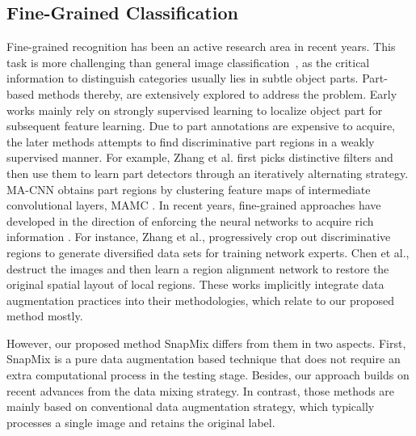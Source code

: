 \documentclass[letterpaper]{article} \usepackage{aaai21}  \usepackage{times}  \usepackage{helvet} \usepackage{courier}  \usepackage[hyphens]{url}  \usepackage{graphicx} \urlstyle{rm} \def\UrlFont{\rm}  \usepackage{natbib}  \usepackage{caption} \frenchspacing  \setlength{\pdfpagewidth}{8.5in}  \setlength{\pdfpageheight}{11in}
\begin{document}
\subsection{Fine-Grained Classification} 
Fine-grained recognition has been an active research area in recent years. This task is more challenging than general 
image classification~\cite{LiuTPAMI16,Wang11TIP,Yang18TNNLS,Yang_2020_CVPR,yang2020factorizable}, as the critical information to distinguish categories usually lies in subtle object parts. Part-based methods thereby, are extensively explored to address the problem. Early works  \cite{huang2016part,zhang2014part, xiao2015application,lin2015deep,xu2015augmenting,xu2016friend} mainly rely on strongly supervised learning to localize object part for subsequent feature learning. Due to part annotations are expensive to acquire, the later methods \cite{zhang2016picking, Zheng2017,sun2018multi, zheng2019looking} attempts to find discriminative part regions in a weakly supervised manner. For example, Zhang et al. \cite{zhang2016picking} first picks distinctive filters and then use them to learn part detectors through an iteratively alternating strategy. MA-CNN \cite{Zheng2017}  obtains part regions by clustering feature maps of intermediate convolutional layers, MAMC \cite{sun2018multi}. In recent years, fine-grained approaches have developed in the direction of enforcing the neural networks to acquire rich information \cite{yang2018learning, ding2019selective, chen2019destruction, zhang2019learning}. For instance, Zhang et al.,\cite{zhang2019learning}  progressively crop out discriminative regions to generate diversified data sets for training network experts. Chen et al., \cite{chen2019destruction} destruct the images and then learn a region alignment network to restore the original spatial layout of local regions. These works implicitly integrate data augmentation practices into their methodologies, which relate to our proposed method mostly.  

However, our proposed method SnapMix differs from them in two aspects. First, SnapMix is a pure data augmentation based technique that does not require an extra computational process in the testing stage. Besides, our approach builds on recent advances from the data mixing strategy. In contrast, those methods are mainly based on conventional data augmentation strategy, which typically processes a single image and retains the original label. 
\end{document}
